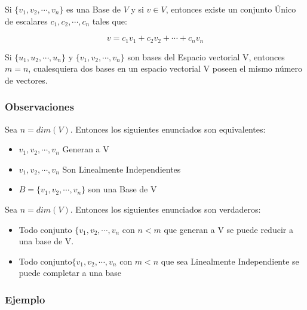 \documentclass[12pt]{report}							    %
\begin{document}
        Si $\{ v_1, v_2,\cdots, v_n\}$ es una Base de $V$ y si $v \in V$, entonces
        existe un conjunto Único de escalares $c_1, c_2, \cdots, c_n$ tales que:

        \begin{equation}
            v = c_1v_1 + c_2v_2 + \cdots + c_nv_n
        \end{equation}

        Si $\{u_1, u_2, \cdots, u_n\}$ y $\{v_1, v_2, \cdots, v_n\}$ son bases del
        Espacio vectorial V, entonces $m = n$, cualesquiera dos bases en un espacio
        vectorial V poseen el mismo número de vectores.

        \subsubsection{Observaciones}
        Sea $n = dim(V)$. Entonces los siguientes enunciados son equivalentes:
        \begin{itemize}
            \item $v_1, v_2, \cdots ,v_n$ Generan a V
            \item $v_1, v_2, \cdots ,v_n$ Son Linealmente Independientes
            \item $B = \{ v_1, v_2, \cdots ,v_n \}$ son una Base de V
        \end{itemize}

        Sea $n = dim(V)$. Entonces los siguientes enunciados son verdaderos:
        \begin{itemize}
            \item Todo conjunto $\{ v_1, v_2, \cdots ,v_n$ con $n < m$ que generan a V
            se puede reducir a una base de V.

            \item Todo conjunto$\{ v_1, v_2, \cdots ,v_n$ con $m < n$ que sea Linealmente
            Independiente se puede completar a una base
        \end{itemize}

        \subsubsection{Ejemplo}
\end{document}
